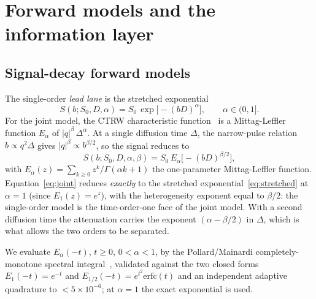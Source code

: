 \documentclass[11pt]{article}
\newcommand{\Ealpha}{E_{\alpha}}
\begin{document}
\section{Forward models and the information layer}
\label{sec:methods}

\subsection{Signal-decay forward models}
The single-order \emph{lead lane} is the stretched exponential~\citep{bennett2003}
\begin{equation}
S(b;S_0,D,\alpha)=S_0\,\exp\!\big[-(bD)^{\alpha}\big],\qquad \alpha\in(0,1].
\label{eq:stretched}
\end{equation}
For the joint model, the CTRW characteristic function~\citep{magin2013} is a Mittag-Leffler
function $\Ealpha$ of $|q|^\beta\,\Delta^{\alpha}$. At a single diffusion time $\Delta$, the
narrow-pulse relation $b\propto q^2\Delta$ gives $|q|^\beta\propto b^{\beta/2}$, so the signal
reduces to
\begin{equation}
S(b;S_0,D,\alpha,\beta)=S_0\,\Ealpha\!\big[-(bD)^{\beta/2}\big],
\label{eq:joint}
\end{equation}
with $\Ealpha(z)=\sum_{k\ge0}z^{k}/\Gamma(\alpha k+1)$ the one-parameter Mittag-Leffler
function. Equation~\eqref{eq:joint} reduces \emph{exactly} to the stretched
exponential~\eqref{eq:stretched} at $\alpha=1$ (since $E_1(z)=e^{z}$), with the heterogeneity
exponent equal to $\beta/2$: the single-order model is the time-order-one face of the joint
model. With a second diffusion time the attenuation carries the exponent $(\alpha-\beta/2)$ in
$\Delta$, which is what allows the two orders to be separated.

We evaluate $\Ealpha(-t)$, $t\ge0$, $0<\alpha<1$, by the Pollard/Mainardi completely-monotone
spectral integral~\citep{mainardi2010}, validated against the two closed forms
$E_1(-t)=e^{-t}$ and $E_{1/2}(-t)=e^{t^2}\mathrm{erfc}(t)$ and an independent adaptive
quadrature to $<5\times10^{-6}$; at $\alpha=1$ the exact exponential is used.
\end{document}
